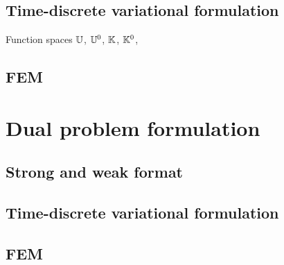 \subsection{Time-discrete variational formulation}

Function spaces ${\mathbb{U}}$, ${\mathbb{U}}^0$, ${\mathbb{K}}$, ${\mathbb{K}}^0$,

\subsection{FEM}

\section{Dual problem formulation}

\subsection{Strong and weak format}

\subsection{Time-discrete variational formulation}

\subsection{FEM}